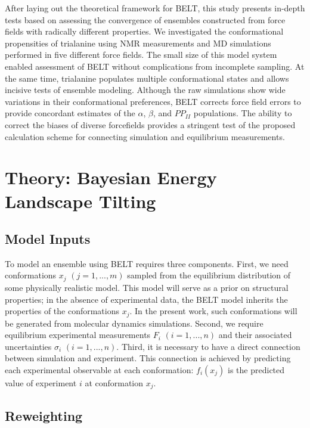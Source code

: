 \documentclass[journal=jacsat,manuscript=article]{achemso}
\begin{document}
After laying out the theoretical framework for BELT, this study presents in-depth tests based on assessing the convergence of ensembles constructed from force fields with radically different properties.  We investigated the conformational propensities of trialanine using NMR measurements \cite{Graf2007} and MD simulations performed in five different force fields.  The small size of this model system enabled assessment of BELT without complications from incomplete sampling.  At the same time, trialanine populates multiple conformational states and allows incisive tests of ensemble modeling.  Although the raw simulations show wide variations in their conformational preferences, BELT corrects force field errors to provide concordant estimates of the $\alpha$, $\beta$, and $PP_{II}$ populations.  The ability to correct the biases of diverse forcefields provides a stringent test of the proposed calculation scheme for connecting simulation and equilibrium measurements. 


\section*{Theory: Bayesian Energy Landscape Tilting}

\subsection*{Model Inputs}

To model an ensemble using BELT requires three components.  First, we need conformations $x_j$  $(j = 1 , ... , m)$ sampled from the equilibrium distribution of some physically realistic model.  This model will serve as a prior on structural properties; in the absence of experimental data, the BELT model inherits the properties of the conformations $x_j$.  In the present work, such conformations will be generated from molecular dynamics simulations.  Second, we require equilibrium experimental measurements $F_i$ $(i = 1 , ... , n)$ and their associated uncertainties $\sigma_i$ $(i = 1 , ... , n)$.  Third, it is necessary to have a direct connection between simulation and experiment.  This connection is achieved by predicting each experimental observable at each conformation: $f_i(x_j)$ is the predicted value of experiment $i$ at conformation $x_j$.  

\subsection*{Reweighting}
\end{document}
